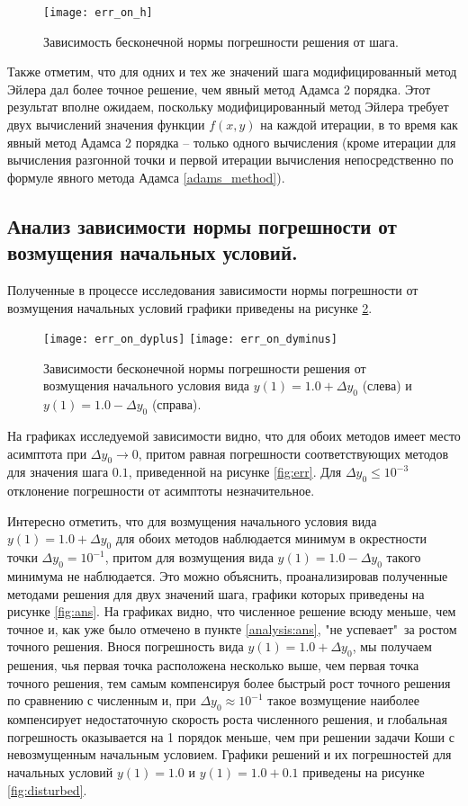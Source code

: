 \documentclass[a4paper, 12pt]{article}
\theoremstyle{mythm}
\begin{document}
	\begin{figure}[H]\centering
		\texttt{[image: err\_on\_h]}
		\caption{Зависимость бесконечной нормы погрешности решения от шага.}\label{fig:err_on_h}
	\end{figure}
	
	Также отметим, что для одних и тех же значений шага модифицированный метод Эйлера дал более точное решение, чем явный метод Адамса 2 порядка. Этот результат вполне ожидаем, поскольку модифицированный метод Эйлера требует двух вычислений значения функции $f(x,y)$ на каждой итерации, в то время как явный метод Адамса 2 порядка -- только одного вычисления (кроме итерации для вычисления разгонной точки и первой итерации вычисления непосредственно по формуле явного метода Адамса \eqref{adams_method}).
	
	\subsection{Анализ зависимости нормы погрешности от возмущения начальных условий.}
	
	Полученные в процессе исследования зависимости нормы погрешности от возмущения начальных условий графики приведены на рисунке \ref{fig:err_on_dy}.
	
	\begin{figure}[H]\centering
		\texttt{[image: err\_on\_dyplus]}
		\texttt{[image: err\_on\_dyminus]}
		\caption{Зависимости бесконечной нормы погрешности решения от возмущения начального условия вида $y(1) = 1.0+\Delta y_0$ (слева) и $y(1) = 1.0-\Delta y_0$ (справа).}\label{fig:err_on_dy}
	\end{figure}

	На графиках исследуемой зависимости видно, что для обоих методов имеет место асимптота при $\Delta y_0 \rightarrow 0$, притом равная погрешности соответствующих методов для значения шага $0.1$, приведенной на рисунке \ref{fig:err}. Для $\Delta y_0 \leq 10^{-3}$ отклонение погрешности от асимптоты незначительное. 
	
	Интересно отметить, что для возмущения начального условия вида $y(1)=1.0+\Delta y_0$ для обоих методов наблюдается минимум в окрестности точки $\Delta y_0 = 10^{-1}$, притом для возмущения вида $y(1)=1.0-\Delta y_0$ такого минимума не наблюдается. Это можно объяснить, проанализировав полученные методами решения для двух значений шага, графики которых приведены на рисунке \ref{fig:ans}. На графиках видно, что численное решение всюду меньше, чем точное и, как уже было отмечено в пункте \ref{analysis:ans}, "не успевает"\ за ростом точного решения. Внося погрешность вида $y(1)=1.0+\Delta y_0$, мы получаем решения, чья первая точка расположена несколько выше, чем первая точка точного решения, тем самым компенсируя более быстрый рост точного решения по сравнению с численным и, при $\Delta y_0 \approx 10^{-1}$ такое возмущение наиболее компенсирует недостаточную скорость роста численного решения, и глобальная погрешность оказывается на 1 порядок меньше, чем при решении задачи Коши с невозмущенным начальным условием. Графики решений и их погрешностей для  начальных условий $y(1)=1.0$ и $y(1)=1.0+0.1$ приведены на рисунке \ref{fig:disturbed}.
	
\end{document}

